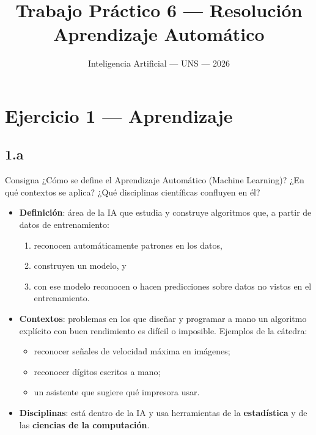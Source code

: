 \documentclass[11pt,a4paper]{article}
\title{\vspace{-1.5cm}\textbf{Trabajo Práctico 6 --- Resolución}\\[3pt]
\large Aprendizaje Automático}
\author{\normalsize Inteligencia Artificial --- UNS --- 2026}
\date{}
\begin{document}
\maketitle
\vspace{-1cm}
\notafuentes

\indice

\section{Ejercicio 1 --- Aprendizaje}

\subsection{1.a}

\begin{enunciado}{Consigna}
¿Cómo se define el Aprendizaje Automático (Machine Learning)? ¿En qué contextos se aplica? ¿Qué disciplinas científicas confluyen en él?
\end{enunciado}

\begin{itemize}
  \item \textbf{Definición}: área de la IA que estudia y construye algoritmos que, a partir de datos de entrenamiento:
  \begin{enumerate}
    \item reconocen automáticamente patrones en los datos,
    \item construyen un modelo, y
    \item con ese modelo reconocen o hacen predicciones sobre datos no vistos en el entrenamiento.
  \end{enumerate}
  \item \textbf{Contextos}: problemas en los que diseñar y programar a mano un algoritmo explícito con buen rendimiento es difícil o imposible. Ejemplos de la cátedra:
  \begin{itemize}
    \item reconocer señales de velocidad máxima en imágenes;
    \item reconocer dígitos escritos a mano;
    \item un asistente que sugiere qué impresora usar.
  \end{itemize}
  \item \textbf{Disciplinas}: está dentro de la IA y usa herramientas de la \textbf{estadística} y de las \textbf{ciencias de la computación}.
\end{itemize}
\end{document}
